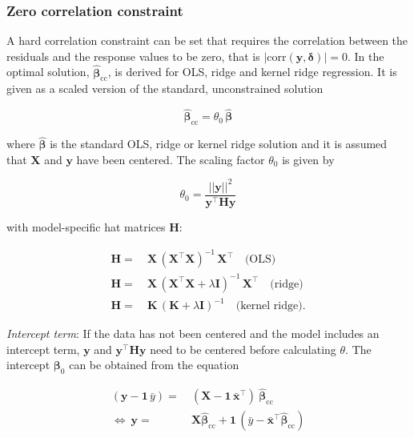 \documentclass[utf8]{frontiersSCNS} %
\renewcommand{\a}{\theta}
\newcommand{\az}{\a_0}
\renewcommand{\b}{\boldsymbol{\beta}} %
\newcommand{\bh}{\boldsymbol{\hat{\beta}}} %
\newcommand{\bcc}{\boldsymbol{\hat{\beta}}_\text{cc}} %
\newcommand{\corr}{\text{corr}}
\renewcommand{\d}{\boldsymbol{\delta}}
\renewcommand{\H}{\mathbf{H}}
\newcommand{\I}{\mathbf{I}}
\newcommand{\K}{\mathbf{K}}
\newcommand{\mx}{\mathbf{\bar{x}}}
\newcommand{\my}{\bar{y}}
\newcommand{\one}{\mathbf{1}}
\newcommand{\X}{\mathbf{X}}
\newcommand{\y}{\mathbf{y}}
\begin{document}


\subsubsection{Zero correlation constraint}\label{sec:zero_correlation_constraint}

A hard correlation constraint can be set that requires the correlation between the residuals and the response values to be zero, that is $|\corr(\y,\d)|=0$. In  the optimal solution, $\bcc$, is derived for OLS, ridge and kernel ridge regression. It is given as a scaled version of the standard, unconstrained solution

\begin{equation}
 \bcc = \az\, \bh
\end{equation}

where $\bh$ is the standard OLS, ridge or kernel ridge solution and it is assumed that $\X$ and $\y$ have been centered. The scaling factor $\az$ is given by

\begin{equation}\label{eq:scaling_factor}
 \az = \frac{||\y||^2}{\y^\top\H\y}
\end{equation}

with model-specific hat matrices $\H$:

\begin{equation*}
\begin{split}
\H =&\ \X\,(\X^\top\X)^{-1}\,\X^\top\quad \text{(OLS)}\\
\H =&\ \X\,(\X^\top\X + \lambda\I)^{-1}\,\X^\top  \quad\text{(ridge)}\\
\H =&\ \K\,(\K + \lambda\I)^{-1}\quad\text{(kernel ridge)}.
\end{split}
\end{equation*}

\textit{Intercept term}: If the data has not been centered and the model includes an intercept term, $\y$ and $\y^\top\H\y$ need to be centered before calculating $\a$. The intercept $\b_0$ can be obtained from the equation

\begin{equation*}
\begin{split}
(\y - \one\, \my) =&\  (\X - \one\,\mx^\top)\ \bcc\\
\Leftrightarrow\ \y =&\ \X\bcc + \one\,(\my - \mx^\top\bcc)
\end{split}
\end{equation*}
\end{document}
